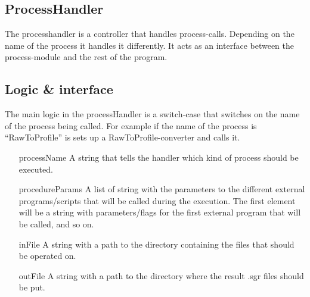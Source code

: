 \subsection{ProcessHandler}
The processhandler is a controller that handles process-calls. Depending on the name of the process it handles it differently. It acts as an interface between the process-module and the rest of the program. 


\subsection{Logic \& interface}
The main logic in the processHandler is a switch-case that switches on the name of the process being called. For example if the name of the process is “RawToProfile” is sets up a RawToProfile-converter and calls it. 

\begin{itemize}
\item[processName] A string that tells the handler which kind of process should be executed.
\item[procedureParams] A list of string with the parameters to the different external  programs/scripts that will be called during the execution. The first element will be a string with parameters/flags for the first external program that will be called, and so on.
\item[inFile] A string with a path to the directory containing the files that should be operated on.
\item[outFile] A string with a path to the directory where the result .sgr files should be put.

\end{itemize}




